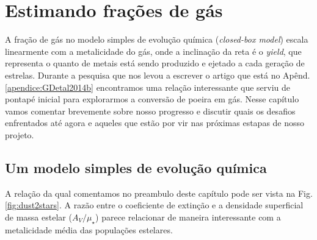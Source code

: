 



\chapter{Estimando frações de gás}
\label{sec:gasfrac}

A fração de gás no modelo simples de evolução química ({\em closed-box model}) escala linearmente
com a metalicidade do gás, onde a inclinação da reta é o {\em yield}, que representa o quanto de
metais está sendo produzido e ejetado a cada geração de estrelas. Durante a pesquisa que nos levou a
escrever o artigo que está no Apênd. \ref{apendice:GDetal2014b} encontramos uma relação
interessante que serviu de pontapé inicial para explorarmos a conversão de poeira em gás. Nesse
capítulo vamos comentar brevemente sobre nosso progresso e discutir quais os desafios enfrentados
até agora e aqueles que estão por vir nas próximas estapas de nosso projeto.

\section{Um modelo simples de evolução química}
\label{sec:gasfrac:closedbox}

A relação da qual comentamos no preambulo deste capítulo pode ser vista na Fig.
\ref{fig:dust2stars}. A razão entre o coeficiente de extinção e a densidade superficial de massa
estelar ($A_V / \mu_\star$) parece relacionar de maneira interessante com a metalicidade média das
populações estelares. 

